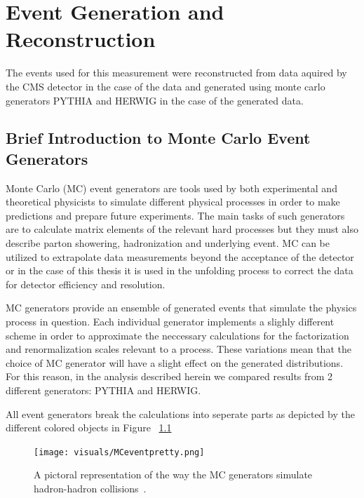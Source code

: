 \chapter{Event Generation and Reconstruction}\label{chap:MCGenReco}


The events used for this measurement were reconstructed from data aquired by the CMS detector in the case of the data and generated using monte carlo generators PYTHIA and HERWIG in the case of the generated data.

\section{Brief Introduction to Monte Carlo Event Generators}\label{secMCGen}

Monte Carlo (MC) event generators are tools used by both experimental and theoretical physicists to simulate different physical processes in order to make predictions and prepare future experiments. The main tasks of such generators are to calculate matrix elements of the relevant hard processes but they must also describe parton showering, hadronization and underlying event. MC can be utilized to extrapolate data measurements beyond the acceptance of the detector or in the case of this thesis it is used in the unfolding process to correct the data for detector efficiency and resolution.


MC generators provide an ensemble of generated events that simulate the physics process in question. Each individual generator implements a slighly different scheme in order to approximate the neccessary calculations for the factorization and renormalization scales relevant to a process. These variations mean that the choice of MC generator will have a slight effect on the generated distributions. For this reason, in the analysis described herein we compared results from 2 different generators: PYTHIA and HERWIG.



All event generators break the calculations into seperate parts as depicted by the different colored objects in Figure ~\ref{fig:MCeventpretty}  


\begin{figure}[htb]
\centering
\texttt{[image: visuals/MCeventpretty.png]}
\caption{A pictoral representation of the way the MC generators simulate hadron-hadron collisions~\cite{Hoche:2014rga}.}
\label{fig:MCeventpretty}
\end{figure}






